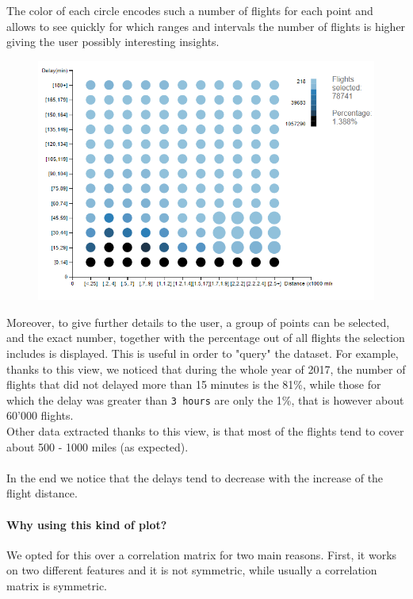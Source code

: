 \documentclass[a4paper, 12pt]{article}
\begin{document}
The color of each circle encodes such a number of flights for each point and allows to see quickly
for which ranges and intervals the number of flights is higher giving the user possibly interesting
insights.

\begin{figure}[h]	
\centering
\includegraphics[scale=0.7]{ddscat.PNG}
\end{figure}

Moreover, to give further details to the user, a group of points can be selected, and the exact number,
together with the percentage out of all flights the selection includes is displayed. This is useful in
order to "query" the dataset. For example, thanks to this view, we noticed that during the whole year of
2017, the number of flights that did not delayed more than 15 minutes is the 81\%, while those for which
the delay was greater than \texttt{3 hours} are only the 1\%, that is however about 60'000 flights.
\\
Other data extracted thanks to this view, is that most of the flights tend to cover about 500 - 1000
miles (as expected).
\\
\\
In the end we notice that the delays tend to decrease with the increase of the flight distance.
\paragraph{Why using this kind of plot?}
We opted for this over a correlation matrix for two main reasons. First, it works on two different
features and it is not symmetric, while usually a correlation matrix is symmetric.
\end{document}
